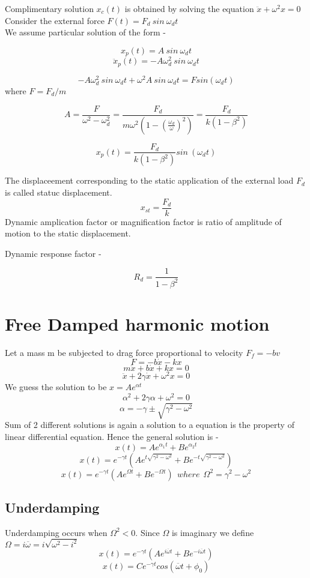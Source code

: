 \documentclass{book}
\begin{document}
\noindent
Complimentary solution \(x_c(t)\) is obtained by solving the equation \(\ddot{x} + \omega^2{x} = 0 \)\\

\noindent
Consider the external force \( F(t) = F_d \ sin \ \omega_d t \)\\
We assume particular solution of the form - 

\[ x_p(t) = A \ sin \ \omega_d t \]
\[ \ddot{x}_p(t) =- A \omega_d^2 \ sin \ \omega_d t \]

\[ - A \omega_d^2 \ sin \ \omega_d t + \omega^2  A \ sin \ \omega_d t = F sin (\omega_d t) \] 
where \(F = F_d/m\)

\[ A = \frac{F}{ \omega^2 - \omega_d^2} = \frac{F_d}{m\omega^2(1 - (\frac{\omega_d}{\omega})^2 )} = \frac{F_d}{k ( 1 - \beta^2)} \]

\[ x_p(t) = \frac{F_d}{k ( 1 - \beta^2)} sin \ (\omega_d t )\]

The displaceement corresponding to the static application of the external load \( F_d\) is called statuc displacement.
\[ x_{st} = \frac{F_d}{k}\]
Dynamic amplication factor or magnification factor is ratio of amplitude of motion to the static displacement.

Dynamic response factor - 
\begin{tcolorbox}[colback=yellow!40!white, colframe=black, width=\textwidth, boxrule=0.5mm, sharp corners, left=1mm, right=1mm, top=1mm, bottom=1mm]
\[ R_d = \frac{ 1}{1 - \beta^2} \]
\end{tcolorbox}

\section{Free Damped harmonic motion}
Let a mass m be subjected to drag force proportional to velocity \(F_f = -bv\)
\[ F = -b\dot{x} -kx\]
\[ m\ddot{x} + b\dot{x} +kx = 0\]
\[ \ddot{x} + 2\gamma \dot{x} + \omega^2x =0\]
We guess the solution to be \(x=Ae^{\alpha t}\)
\[ \alpha^2 + 2\gamma \alpha + \omega^2 =0\]
\[ \alpha = - \gamma \pm \sqrt{\gamma^2 - \omega^2}\]
Sum of 2 different solutions is again a solution to a equation is the property of linear differential equation.
Hence the general solution is -
\[ x(t) = Ae^{\alpha_1 t} + Be^{\alpha_2 t}\]
\[ x(t) = e^{-\gamma t}(Ae^{t\sqrt{\gamma^2 - \omega^2}} + Be^{-t\sqrt{\gamma^2 - \omega^2}})\]
\[ x(t) = e^{-\gamma t}(Ae^{\Omega t} + Be^{-\Omega t}) \ \  where \ \ \Omega^2 = \gamma^2 - \omega^2\]

\subsection{Underdamping}
Underdamping occurs when \(\Omega^2 < 0\). Since \(\Omega\) is imaginary we define \(\Omega = i \overline{\omega} = i\sqrt{\omega^2 - i^2}\)
\[ x(t) =e^{-\gamma t} (Ae^{i\overline{\omega} t} + Be^{-i\overline{\omega} t})\]
\[x(t) = C e^{-\gamma t} cos(\overline{\omega} t + \phi_0)\]
\end{document}

